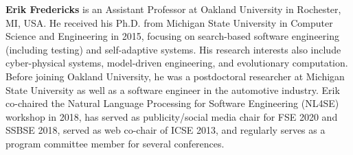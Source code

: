 \documentclass[sigconf,review]{acmart}
\newcommand{\TODO}[1]{\textbf{\textcolor{ScarletRed}{[TODO: #1]}}\xspace}
\newcommand{\TODO}[1]{}
\begin{document}
{\bf Erik Fredericks} is an Assistant Professor at Oakland University
in Rochester, MI, USA.  He received his Ph.D. from Michigan State University in
Computer Science and Engineering in 2015, focusing on search-based software engineering (including testing)
and self-adaptive systems.  His research interests also include cyber-physical systems,
model-driven engineering, and evolutionary computation.  Before joining Oakland University,
he was a postdoctoral researcher at Michigan State University as well as a software engineer
in the automotive industry.  Erik co-chaired the Natural Language Processing for Software Engineering (NL4SE)
workshop in 2018, has served as publicity/social media chair for FSE 2020 and SSBSE 2018,
served as web co-chair of ICSE 2013, and regularly serves as a program committee member for several conferences.






%



\end{document}
